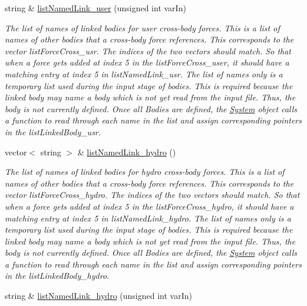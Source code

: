 \begin{DoxyCompactItemize}
string \& \hyperlink{class_body_a1fd7e672b9768351f9a53523d7b5c798}{list\-Named\-Link\-\_\-user} (unsigned int var\-In)
\begin{DoxyCompactList}\small\item\em The list of names of linked bodies for user cross-\/body forces. This is a list of names of other bodies that a cross-\/body force references. This corresponds to the vector list\-Force\-Cross\-\_\-usr. The indices of the two vectors should match. So that when a force gets added at index 5 in the list\-Force\-Cross\-\_\-user, it should have a matching entry at index 5 in list\-Named\-Link\-\_\-usr. The list of names only is a temporary list used during the input stage of bodies. This is required because the linked body may name a body which is not yet read from the input file. Thus, the body is not currently defined. Once all Bodies are defined, the \hyperlink{class_system}{System} object calls a function to read through each name in the list and assign corresponding pointers in the list\-Linked\-Body\-\_\-usr. \end{DoxyCompactList}\item 
vector$<$ string $>$ \& \hyperlink{class_body_abc4abd052a3776123df114c6faf34bae}{list\-Named\-Link\-\_\-hydro} ()
\begin{DoxyCompactList}\small\item\em The list of names of linked bodies for hydro cross-\/body forces. This is a list of names of other bodies that a cross-\/body force references. This corresponds to the vector list\-Force\-Cross\-\_\-hydro. The indices of the two vectors should match. So that when a force gets added at index 5 in the list\-Force\-Cross\-\_\-hydro, it should have a matching entry at index 5 in list\-Named\-Link\-\_\-hydro. The list of names only is a temporary list used during the input stage of bodies. This is required because the linked body may name a body which is not yet read from the input file. Thus, the body is not currently defined. Once all Bodies are defined, the \hyperlink{class_system}{System} object calls a function to read through each name in the list and assign corresponding pointers in the list\-Linked\-Body\-\_\-hydro. \end{DoxyCompactList}\item 
string \& \hyperlink{class_body_ad01b96bf575dde9f75f489c7118ca574}{list\-Named\-Link\-\_\-hydro} (unsigned int var\-In)

\end{DoxyCompactItemize}
